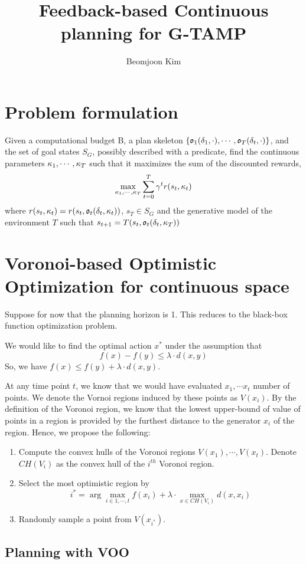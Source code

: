 \documentclass[10pt,letterpaper]{article}
\author{Beomjoon Kim}
\title{Feedback-based Continuous planning for G-TAMP}
\begin{document}
\maketitle
\section{Problem formulation}
Given a computational budget B,
a plan skeleton $\{\mathfrak{o}_1(\delta_1,\cdot),\cdots,\mathfrak{o}_T(\delta_t,\cdot)\}$, 
and the set of goal states $S_G$, possibly described with a predicate,
find the continuous parameters $\kappa_1,\cdots,\kappa_T$ such that it maximizes
the sum of the discounted rewards,
$$ \max_{\kappa_1,\cdots,\kappa_T}  \sum_{t=0}^{T
}  \gamma^t r(s_t,\kappa_t)  $$
where $r(s_t,\kappa_t) = r(s_t,\mathfrak{o}_t(\delta_t,\kappa_t) )$, $s_T \in S_G$ and
the generative model of the environment $T$ such that $s_{t+1} = T(s_t,\mathfrak{o}_t(\delta_t,\kappa_T))$

\section{Voronoi-based Optimistic Optimization for continuous space}
Suppose for now that the planning horizon is 1. This reduces to the black-box
function optimization problem. 

We would like to find the optimal action $x^*$ under the assumption that 
$$ f(x) - f(y) \leq \lambda \cdot d(x,y)$$
So, we have
$ f(x) \leq f(y) + \lambda \cdot d(x,y)$.

At any time point $t$, we know that we would have evaluated $x_1,\cdots x_t$ number of points.
We denote the Vornoi regions induced by these points as $V(x_i)$. By the definition of the 
Voronoi region, we know that the lowest upper-bound of value of points in a region
is provided by the furthest distance to the 
generator $x_i$ of the region. Hence, we  propose the following:
\begin{enumerate}
\item Compute the convex hulls of the Voronoi regions $V(x_1),\cdots, V(x_t)$. Denote $CH(V_i)$ as the
convex hull of the $i^{th}$ Voronoi region.
\item Select the most optimistic region by  $$ i^* = \arg\max_{i \in {1,\cdots,t}} f(x_i) + \lambda \cdot \max_{x \in CH(V_i)} d(x,x_i)$$ 
\item Randomly sample a point from $V(x_{i^*})$.
\end{enumerate}

\subsection{Planning with VOO}
\end{document}
